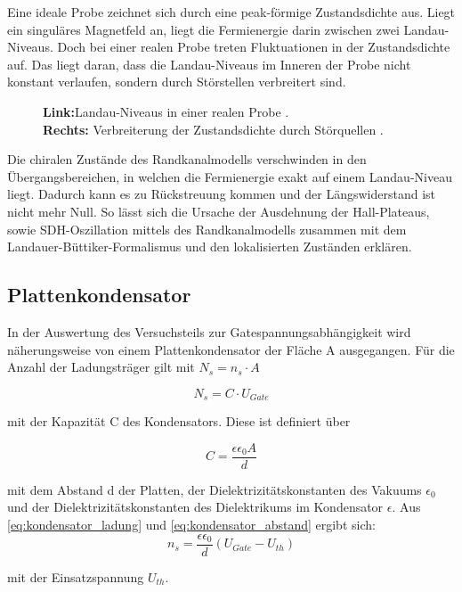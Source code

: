 Eine ideale Probe zeichnet sich durch eine peak-förmige Zustandsdichte aus. Liegt ein singuläres Magnetfeld an, liegt die Fermienergie darin zwischen zwei Landau-Niveaus. Doch bei einer realen Probe treten Fluktuationen in der Zustandsdichte auf. Das liegt daran, dass die Landau-Niveaus im Inneren der Probe nicht konstant verlaufen, sondern durch Störstellen verbreitert sind.

\begin{figure}[h]
\centering
{}
\caption[Struktur von Landau-Niveaus in realer Probe]{
	\textbf{Link:}Landau-Niveaus in einer realen Probe \cite{anleitung}.\\
	\textbf{Rechts:} Verbreiterung der Zustandsdichte durch Störquellen \cite{anleitung}.}
\label{fig:fermi_landau_Anleitungsheft}
\end{figure}

Die chiralen Zustände des Randkanalmodells verschwinden in den Übergangsbereichen, in welchen die Fermienergie exakt auf einem Landau-Niveau liegt. Dadurch kann es zu Rückstreuung kommen und der Längswiderstand ist nicht mehr Null.  
So lässt sich die Ursache der Ausdehnung der Hall-Plateaus, sowie SDH-Oszillation mittels des Randkanalmodells zusammen mit dem Landauer-Büttiker-Formalismus und den lokalisierten Zuständen erklären.


\subsection{Plattenkondensator}

In der Auswertung des Versuchsteils zur Gatespannungsabhängigkeit wird näherungsweise von einem Plattenkondensator der Fläche A ausgegangen. Für die Anzahl der Ladungsträger gilt mit $N_s=n_s \cdot A$ 

\begin{equation}
N_s=C \cdot U_{Gate}
\label{eq:kondensator_ladung}
\end{equation}

mit der Kapazität C des Kondensators. Diese ist definiert über

\begin{equation}
C=\frac{\epsilon \epsilon_0 A}{d}
\label{eq:kondensator_abstand}
\end{equation}

mit dem Abstand d der Platten, der Dielektrizitätskonstanten des Vakuums $\epsilon_0$ und der Dielektrizitätskonstanten des Dielektrikums im Kondensator $\epsilon$. 
Aus \ref{eq:kondensator_ladung} und \ref{eq:kondensator_abstand} ergibt sich:
\begin{equation}
n_s=\frac{\epsilon \epsilon_0}{d}(U_{Gate}-U_{th})
\label{eq:kondens_lad_und_abst}
\end{equation}

mit der Einsatzspannung $U_{th}$.
